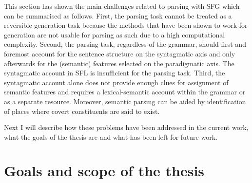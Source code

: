This section has shown the main challenges related to parsing with SFG which can be summarised as follows. 
First, the parsing task cannot be treated as a reversible generation task because the methods that have been shown to work for generation are not usable for parsing as such due to a high computational complexity. Second, the parsing task, regardless of the grammar, should first and foremost account for the sentence structure on the syntagmatic axis and only afterwards for the (semantic) features selected on the paradigmatic axis. The syntagmatic account in SFL is insufficient for the parsing task. Third, the syntagmatic account alone does not provide enough clues for assignment of semantic features and requires a lexical-semantic account within the grammar or as a separate resource. Moreover, semantic parsing can be aided by identification of places where covert constituents are said to exist. %

Next I will describe how these problems have been addressed in the current work, what the goals of the thesis are and what has been left for future work.


%

\section{Goals and scope of the thesis}
\label{sec:solution}

